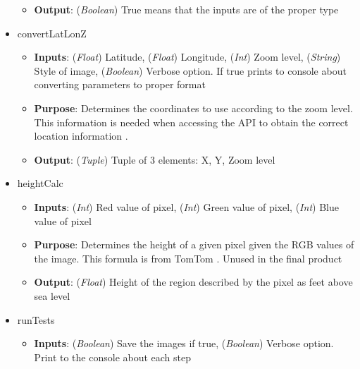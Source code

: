 \begin{itemize}
\begin{itemize}
        \item \textbf{Output}: (\textit{Boolean}) True means that the inputs are of the proper type

    \end{itemize}
    
    \item convertLatLonZ

    \begin{itemize}
        
        \item \textbf{Inputs}: (\textit{Float}) Latitude, (\textit{Float}) Longitude, (\textit{Int}) Zoom level, (\textit{String}) Style of image, (\textit{Boolean}) Verbose option. If true prints to console about converting parameters to proper format

        \item \textbf{Purpose}: Determines the coordinates to use according to the zoom level. This information is needed when accessing the API to obtain the correct location information \cite{ConversionTomTom}. 

        \item \textbf{Output}: (\textit{Tuple}) Tuple of 3 elements: X, Y, Zoom level

    \end{itemize}

    \item heightCalc

    \begin{itemize}
        
        \item \textbf{Inputs}: (\textit{Int}) Red value of pixel, (\textit{Int}) Green value of pixel, (\textit{Int}) Blue value of pixel

        \item \textbf{Purpose}: Determines the height of a given pixel given the RGB values of the image. This formula is from TomTom \cite{HeightCalcTomTom}. Unused in the final product

        \item \textbf{Output}: (\textit{Float}) Height of the region described by the pixel as feet above sea level

    \end{itemize}

    \item runTests

    \begin{itemize}
        
        \item \textbf{Inputs}: (\textit{Boolean}) Save the images if true, (\textit{Boolean}) Verbose option. Print to the console about each step


\end{itemize}
\end{itemize}
